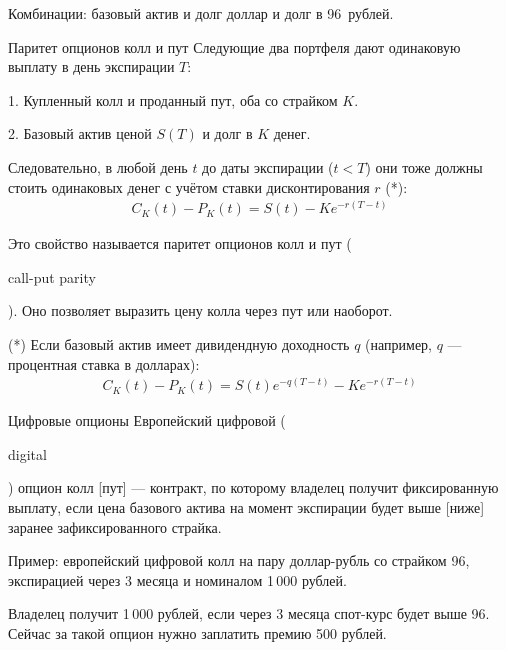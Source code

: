 \documentclass{beamer}
\newcommand{\en}[1]{\begin{otherlanguage}{english}#1\end{otherlanguage}}
\newcommand{\usdrubstrike}{96}
\newcommand{\usdrubaxisspread}{8}
\begin{document}
\begin{frame}{Комбинации: базовый актив и долг}
 доллар и долг в \usdrubstrike\ рублей.

\justifying
\centering
\end{frame}



\begin{frame}{Паритет опционов колл и пут}
\justify
Следующие два портфеля дают одинаковую выплату в день экспирации $T$:

1. Купленный колл и проданный пут, оба со страйком $K$.

2. Базовый актив ценой $S(T)$ и долг в $K$ денег.

\justify
Следовательно, в любой день $t$ до даты экспирации ($t<T$) они тоже должны стоить одинаковых денег с учётом ставки дисконтирования $r$ (*):
\begin{align*}
C_K(t) - P_K(t) = S(t) - Ke^{-r(T-t)}
\end{align*}

\justify
Это свойство называется \alert{паритет опционов колл и пут} (\en{call-put parity}). Оно позволяет выразить цену колла через пут или наоборот.

\justify
(*) Если базовый актив имеет дивидендную доходность $q$ (например, $q$ --- процентная ставка в долларах):
\begin{align*}
C_K(t) - P_K(t) = S(t)e^{-q(T-t)} - Ke^{-r(T-t)}
\end{align*}
\end{frame}



\begin{frame}{Цифровые опционы}
\justify
Европейский \alert{цифровой} (\en{digital}) опцион колл [пут] --- контракт, по которому 
владелец получит фиксированную выплату, если цена базового актива на момент экспирации 
будет выше [ниже] заранее зафиксированного страйка.

\justify
Пример: европейский цифровой колл на пару доллар-рубль со страйком \usdrubstrike, экспирацией 
через 3 месяца и номиналом 1\,000 рублей.

\justify
Владелец получит 1\,000 рублей, если через 3 
месяца спот-курс будет выше \usdrubstrike. Сейчас за такой опцион нужно заплатить премию 500 
рублей.
\end{frame}
\end{document}
